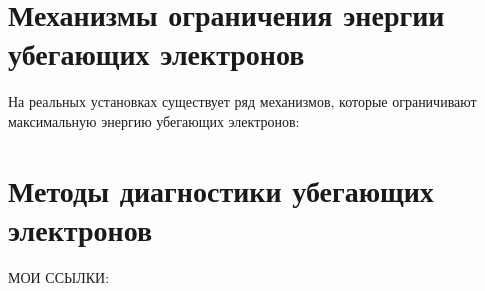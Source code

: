 \section{Механизмы ограничения энергии убегающих электронов}

На реальных установках существует ряд механизмов, которые ограничивают максимальную энергию убегающих электронов: 


\section{Методы диагностики убегающих электронов}\label{sec:ch1/sec2}

МОИ ССЫЛКИ: \cite{Khilkevitch2020} \cite{Reux2015}

\FloatBarrier
